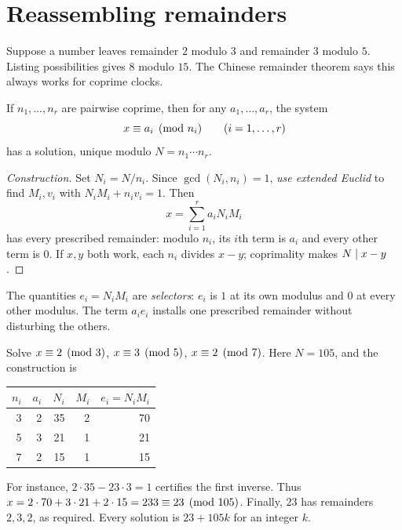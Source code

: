 \section{Reassembling remainders}
\label{sec:crt}

Suppose a number leaves remainder $2$ modulo $3$ and remainder $3$ modulo $5$. Listing possibilities gives $8$ modulo $15$. The Chinese remainder theorem says this always works for coprime clocks.

\begin{theorem}
If $n_1,\dots,n_r$ are pairwise coprime, then for any $a_1,\dots,a_r$, the system
\[
x\equiv a_i\pmod{n_i}\qquad(i=1,\dots,r)
\]
has a solution, unique modulo $N=n_1\cdots n_r$.
\end{theorem}

\begin{proof}[Construction]
Set $N_i=N/n_i$. Since $\gcd(N_i,n_i)=1$, \emph{use extended Euclid} to
find $M_i,v_i$ with $N_iM_i+n_iv_i=1$. Then
\[
x=\sum_{i=1}^r a_iN_iM_i
\]
has every prescribed remainder: modulo $n_i$, its $i$th term is $a_i$ and every other term is $0$. If $x,y$ both work, each $n_i$ divides $x-y$; coprimality makes $N\mid x-y$.
\end{proof}

The quantities $e_i=N_iM_i$ are \emph{selectors}: $e_i$ is $1$ at its
own modulus and $0$ at every other modulus. The term $a_i e_i$ installs
one prescribed remainder without disturbing the others.

\begin{example}
Solve $x\equiv2\pmod3$, $x\equiv3\pmod5$, $x\equiv2\pmod7$.
Here $N=105$, and the construction is
\begin{center}
\begin{tabular}{rrrrr}
\toprule
$n_i$ & $a_i$ & $N_i$ & $M_i$ & $e_i=N_iM_i$ \\
\midrule
3 & 2 & 35 & 2 & 70 \\
5 & 3 & 21 & 1 & 21 \\
7 & 2 & 15 & 1 & 15 \\
\bottomrule
\end{tabular}
\end{center}
For instance, $2\cdot35-23\cdot3=1$ certifies the first inverse.
Thus $x=2\cdot70+3\cdot21+2\cdot15=233\equiv23\pmod{105}$.
Finally, $23$ has remainders $2,3,2$, as required. Every solution is
$23+105k$ for an integer $k$.
\end{example}

